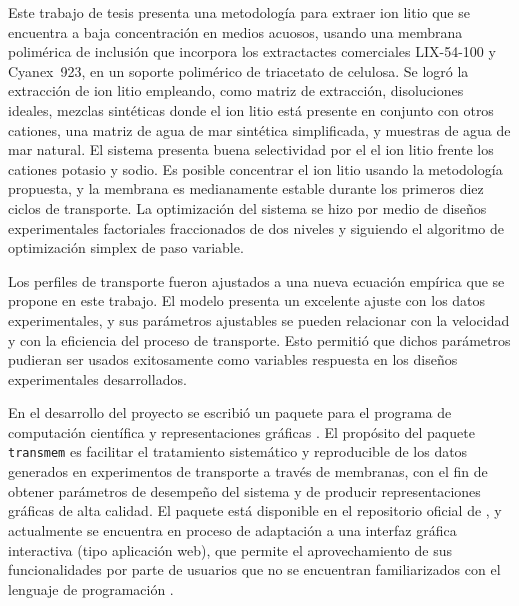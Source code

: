 
\begin{resumen}%
Este trabajo de tesis presenta una metodología para extraer ion litio que se encuentra a baja concentración en medios acuosos, usando una membrana polimérica de inclusión que incorpora los extractactes comerciales LIX-54-100 y Cyanex~923, en un soporte polimérico de triacetato de celulosa. Se logró la extracción de ion litio empleando, como matriz de extracción, disoluciones ideales, mezclas sintéticas donde el ion litio está presente en conjunto con otros cationes, una matriz de agua de mar sintética simplificada, y muestras de agua de mar natural. El sistema presenta buena selectividad por el el ion litio frente los cationes potasio y sodio. Es posible concentrar el ion litio usando la metodología propuesta, y la membrana es medianamente estable durante los primeros diez ciclos de transporte. La optimización del sistema se hizo por medio de diseños experimentales factoriales fraccionados de dos niveles y siguiendo el algoritmo de optimización simplex de paso variable.

Los perfiles de transporte fueron ajustados a una nueva ecuación empírica que se propone en este trabajo. El modelo presenta un excelente ajuste con los datos experimentales, y sus parámetros ajustables se pueden relacionar con la velocidad y con la eficiencia del proceso de transporte. Esto permitió que dichos parámetros pudieran ser usados exitosamente como variables respuesta en los diseños experimentales desarrollados.

En el desarrollo del proyecto se escribió un paquete para el programa de computación científica y representaciones gráficas \R. El propósito del paquete \verb|transmem| es facilitar el tratamiento sistemático y reproducible de los datos generados en experimentos de transporte a través de membranas, con el fin de obtener parámetros de desempeño del sistema y de producir representaciones gráficas de alta calidad. El paquete está disponible en el repositorio oficial de \R, y actualmente se encuentra en proceso de adaptación a una interfaz gráfica interactiva (tipo aplicación web), que permite el aprovechamiento de sus funcionalidades por parte de usuarios que no se encuentran familiarizados con el lenguaje de programación \R.

\end{resumen}
